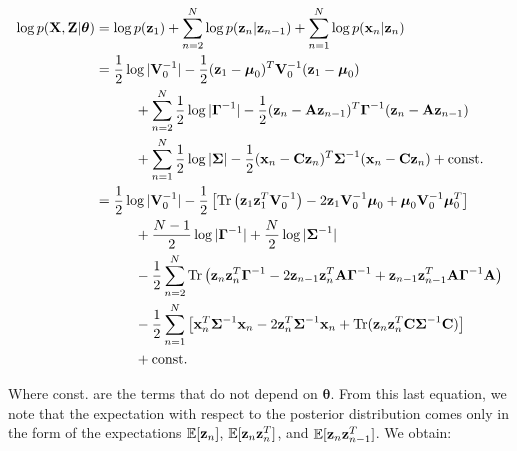\documentclass[11pt]{article}
\begin{document}
\begin{align}
	\log p({\bf X}, {\bf Z}\vert \boldsymbol\theta) &= \log p({\bf z}_1) + \sum_{n=2}^N \log p({\bf z}_n\vert {\bf z}_{n-1}) + \sum_{n=1}^N \log p({\bf x}_n\vert {\bf z}_n)\\
	   &=\frac{1}{2}\log\vert{\bf V}_0^{-1}\vert - \frac{1}{2}({\bf z}_1 - \boldsymbol\mu_0)^T{\bf V}_0^{-1}({\bf z}_1 - \boldsymbol\mu_0) \nonumber \\
	   &\hspace{1cm}+ \sum_{n=2}^N \frac{1}{2}\log\vert\boldsymbol\Gamma^{-1}\vert - \frac{1}{2}({\bf z}_n - {\bf A z}_{n-1})^T\boldsymbol{\Gamma}^{-1}({\bf z}_n - {\bf A z}_{n-1}) \nonumber \\
	   &\hspace{1cm}+\sum_{n=1}^N \frac{1}{2}\log\vert\boldsymbol\Sigma\vert -\frac{1}{2}({\bf x}_n - {\bf C z}_n)^T \boldsymbol{\Sigma}^{-1}({\bf x}_n - {\bf C z}_n) + \text{const.}\\
	   &= \frac{1}{2}\log \vert
	  {\bf V}_0^{-1}\vert -\frac{1}{2}\left[\text{Tr}\left({\bf z}_1 {\bf z}_1^T {\bf V}_0^{-1}\right) -2 {\bf z}_1{\bf V}_0^{-1}\boldsymbol\mu_0 + \boldsymbol\mu_0 {\bf V}_0^{-1}\boldsymbol\mu_0^T\right] \nonumber \\
	  &\hspace{1cm}+ \frac{N-1}{2}\log\vert\boldsymbol\Gamma^{-1}\vert + \frac{N}{2}\log\vert \boldsymbol\Sigma^{-1}\vert \nonumber \\
	  &\hspace{1cm}-\frac{1}{2} \sum_{n=2}^{N}\text{Tr}\left({\bf z}_n{\bf z}_n^T\boldsymbol\Gamma^{-1} -2 {\bf z}_{n-1}{\bf z}_n^T{\bf A}\boldsymbol\Gamma^{-1} +  {\bf z}_{n-1}{\bf z}_{n-1}^T{\bf A}\boldsymbol\Gamma^{-1}{\bf A}\right) \nonumber\\
	  &\hspace{1cm}-\frac{1}{2}\sum_{n=1}^N\left[{\bf x}_n^T\boldsymbol{\Sigma}^{-1}{\bf x}_n-2{\bf z}_n^T\boldsymbol\Sigma^{-1}{\bf x}_n + \text{Tr}({\bf z}_n{\bf z}_n^T{\bf C}\boldsymbol\Sigma^{-1}{\bf C})\right] \nonumber\\
	  &\hspace{1cm} + \text{const.}
\end{align}

Where const. are the terms that do not depend on $\boldsymbol{\theta}$. From this last equation, we note that the expectation with respect to the posterior distribution comes only in the form of the expectations $\mathbb{E}[{\bf z}_n]$, $\mathbb{E}[{\bf z}_n{\bf z}_{n}^{T}]$, and  $\mathbb{E}[{\bf z}_n{\bf z}_{n-1}^{T}]$. We obtain:
\end{document}
